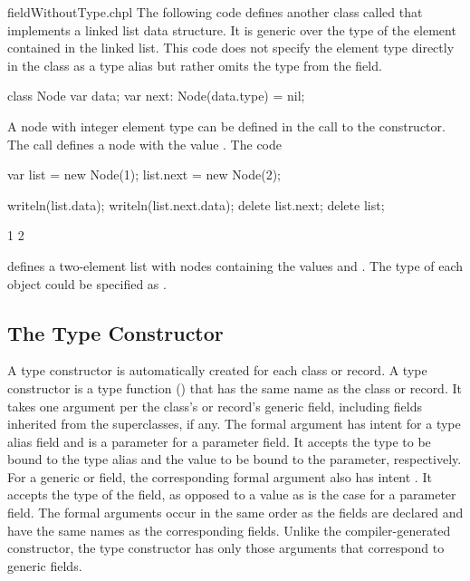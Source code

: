 \begin{chapelexample}{fieldWithoutType.chpl}
The following code defines another class called  that
implements a linked list data structure.  It is generic over the type
of the element contained in the linked list.  This code does not
specify the element type directly in the class as a type alias but
rather omits the type from the  field.
\begin{chapel}
class Node {
  var data;
  var next: Node(data.type) = nil;
}
\end{chapel}
A node with integer element type can be defined in the call to the
constructor.  The call  defines a node with the
value .  The code
\begin{chapel}
var list = new Node(1);
list.next = new Node(2);
\end{chapel}
\begin{chapelpost}
writeln(list.data);
writeln(list.next.data);
delete list.next;
delete list;
\end{chapelpost}
\begin{chapeloutput}
1
2
\end{chapeloutput}
defines a two-element list with nodes containing the values 
and .  The type of each object could be specified
as .
\end{chapelexample}

\subsection{The Type Constructor}
\label{Type_Constructors}

A type constructor is automatically created for each class or record.
A type constructor is a type function () that has
the same name as the class or record.  It takes one argument per the
class's or record's generic field, including fields inherited from the
superclasses, if any.
The formal argument has intent  for a type alias field and is a
parameter for a parameter field. It accepts the type to be bound
to the type alias and the value to be bound to the parameter, respectively.
For a generic  or  field, the corresponding
formal argument also has intent . It accepts the type
of the field, as opposed to a value as is the case for a parameter field.
The formal arguments occur in the same order as the fields are
declared and have the same names as the corresponding fields.
Unlike the compiler-generated constructor, the type constructor has only
those arguments that correspond to generic fields.

